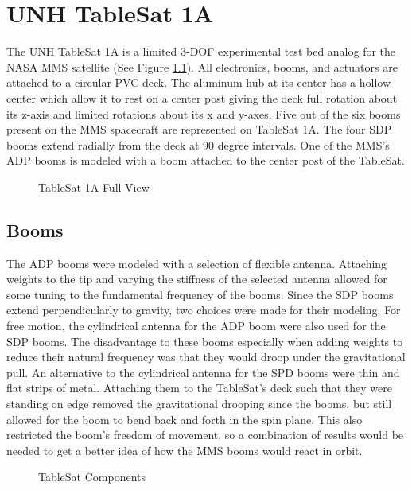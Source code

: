 
\chapter{UNH TableSat 1A}
\label{chap:UNHTableSat1A}

The UNH TableSat 1A is a limited 3-DOF experimental test bed analog for the NASA MMS satellite (See Figure \ref{fig:TSatFullView}).  All electronics, booms, and actuators are attached to a circular PVC deck.  The aluminum hub at its center has a hollow center which allow it to rest on a center post giving the deck full rotation about its z-axis and limited rotations about its x and y-axes.  Five out of the six booms present on the MMS spacecraft are represented on TableSat 1A.  The four SDP booms extend radially from the deck at 90 degree intervals.  One of the MMS's ADP booms is modeled with a boom attached to the center post of the TableSat.



\begin{figure}[H]
\centerline{}
\caption{TableSat 1A Full View}
\label{fig:TSatFullView}
\end{figure}

\section{Booms}
\label{sec:Booms}

The ADP booms were modeled with a selection of flexible antenna.  Attaching weights to the tip and varying the stiffness of the selected antenna allowed for some tuning to the fundamental frequency of the booms.  Since the SDP booms extend perpendicularly to gravity, two choices were made for their modeling.  For free motion, the cylindrical antenna for the ADP boom were also used for the SDP booms.  The disadvantage to these booms especially when adding weights to reduce their natural frequency was that they would droop under the gravitational pull.  An alternative to the cylindrical antenna for the SPD booms were thin and flat strips of metal.  Attaching them to the TableSat's deck such that they were standing on edge removed the gravitational drooping since the booms, but still allowed for the boom to bend back and forth in the spin plane.  This also restricted the boom's freedom of movement, so a combination of results would be needed to get a better idea of how the MMS booms would react in orbit.

\begin{figure}[H]
\centerline{}
\caption{TableSat Components}
\label{fig:TSatComponents}
\end{figure}

